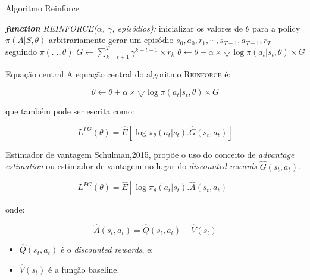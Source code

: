 \documentclass{beamer}
\begin{document}
\begin{frame}{Algoritmo Reinforce}
	\begin{algorithmic} 
		\STATE \emph{\textbf{function} REINFORCE($\alpha$, $\gamma$, episódios):}
		\STATE inicializar os valores de $\theta$ para a policy $\pi(A|S,\theta)$ arbitrariamente
		\STATE gerar um episódio ${s_{0},a_{0},r_{1},\cdots,s_{T-1},a_{T-1},r_{T}}$ seguindo $\pi(.|.,\theta)$
			\STATE $G \leftarrow \sum_{k=t+1}^{T} \gamma^{k-t-1} \times r_{k}$
			\STATE $\theta \leftarrow \theta + \alpha \times \bigtriangledown \log \pi(a_{t}|s_{t}, \theta) \times G$
		\ENDFOR
		\ENDFOR
	\end{algorithmic}
\end{frame}

\begin{frame}{Equação central}
	A equação central do algoritmo \textsc{Reinforce} é: 
	
	\begin{equation}
		\theta \leftarrow \theta + \alpha \times \bigtriangledown \log \pi(a_{t}|s_{t}, \theta) \times G
	\end{equation}

	que também pode ser escrita como: 
	
	\begin{equation}
		L^{PG}(\theta) = \hat{E} \left[ \log \pi_{\theta}(a_{t}|s_{t}).\hat{G}(s_{t},a_{t}) \right]
	\end{equation}
\end{frame}

\begin{frame}{Estimador de vantagem}
	Schulman,2015, propõe o uso do conceito de \textit{advantage estimation} ou estimador de vantagem no lugar do \textit{discounted rewards} $\hat{G}(s_{t},a_{t})$. 
	
	\begin{equation}
	L^{PG}(\theta) = \hat{E} \left[ \log \pi_{\theta}(a_{t}|s_{t}).\hat{A}(s_{t},a_{t}) \right]
	\end{equation}	
	
	onde: 
	
	\begin{equation}
		\hat{A}(s_{t},a_{t}) = \hat{Q}(s_{t},a_{t}) - \hat{V}(s_{t})
	\end{equation}

\begin{itemize}
	\item $\hat{Q}(s_{t},a_{t})$ é o \textit{discounted rewards}, e;
	\item $\hat{V}(s_{t})$ é a função baseline.
\end{itemize}	

\end{frame}
\end{document}
